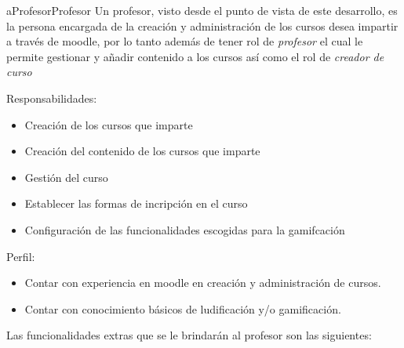     \begin{actor}{aProfesor}{Profesor}{%
    Un profesor, visto desde el punto de vista de este desarrollo, es la persona
    encargada de la creación y administración de los cursos desea impartir a través
    de moodle, por lo tanto además de tener rol de {\it profesor} el cual le permite
    gestionar y añadir contenido a los cursos así como el rol de {\it creador de
    curso} \cite{MoodleRoles} \\}

    \item[Responsabilidades:] \hfill
        \begin{itemize}
        \item Creación de los cursos que imparte
        \item Creación del contenido de los cursos que imparte
        \item Gestión del curso
        \item Establecer las formas de incripción en el curso
        \item Configuración de las funcionalidades escogidas para la gamifcación
        \end{itemize}

    \item[Perfil:] \hfill
        \begin{itemize}
        \item Contar con experiencia en moodle en creación y administración de cursos.
        \item Contar con conocimiento básicos de ludificación y/o gamificación.
        \end{itemize}
    \end{actor}

    \noindent
    Las funcionalidades extras que se le brindarán al profesor son las siguientes:

